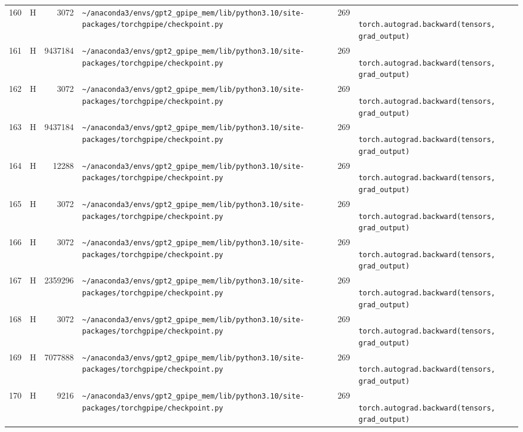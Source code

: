 \documentclass{article}
\begin{document}
\begin{longtable}{r l r p{6.5cm} r p{7.0cm}}
160 & H & 3072 & \lstinline|~/anaconda3/envs/gpt2_gpipe_mem/lib/python3.10/site-packages/torchgpipe/checkpoint.py| & 269 & \lstinline|            torch.autograd.backward(tensors, grad_output)| \\
161 & H & 9437184 & \lstinline|~/anaconda3/envs/gpt2_gpipe_mem/lib/python3.10/site-packages/torchgpipe/checkpoint.py| & 269 & \lstinline|            torch.autograd.backward(tensors, grad_output)| \\
162 & H & 3072 & \lstinline|~/anaconda3/envs/gpt2_gpipe_mem/lib/python3.10/site-packages/torchgpipe/checkpoint.py| & 269 & \lstinline|            torch.autograd.backward(tensors, grad_output)| \\
163 & H & 9437184 & \lstinline|~/anaconda3/envs/gpt2_gpipe_mem/lib/python3.10/site-packages/torchgpipe/checkpoint.py| & 269 & \lstinline|            torch.autograd.backward(tensors, grad_output)| \\
164 & H & 12288 & \lstinline|~/anaconda3/envs/gpt2_gpipe_mem/lib/python3.10/site-packages/torchgpipe/checkpoint.py| & 269 & \lstinline|            torch.autograd.backward(tensors, grad_output)| \\
165 & H & 3072 & \lstinline|~/anaconda3/envs/gpt2_gpipe_mem/lib/python3.10/site-packages/torchgpipe/checkpoint.py| & 269 & \lstinline|            torch.autograd.backward(tensors, grad_output)| \\
166 & H & 3072 & \lstinline|~/anaconda3/envs/gpt2_gpipe_mem/lib/python3.10/site-packages/torchgpipe/checkpoint.py| & 269 & \lstinline|            torch.autograd.backward(tensors, grad_output)| \\
167 & H & 2359296 & \lstinline|~/anaconda3/envs/gpt2_gpipe_mem/lib/python3.10/site-packages/torchgpipe/checkpoint.py| & 269 & \lstinline|            torch.autograd.backward(tensors, grad_output)| \\
168 & H & 3072 & \lstinline|~/anaconda3/envs/gpt2_gpipe_mem/lib/python3.10/site-packages/torchgpipe/checkpoint.py| & 269 & \lstinline|            torch.autograd.backward(tensors, grad_output)| \\
169 & H & 7077888 & \lstinline|~/anaconda3/envs/gpt2_gpipe_mem/lib/python3.10/site-packages/torchgpipe/checkpoint.py| & 269 & \lstinline|            torch.autograd.backward(tensors, grad_output)| \\
170 & H & 9216 & \lstinline|~/anaconda3/envs/gpt2_gpipe_mem/lib/python3.10/site-packages/torchgpipe/checkpoint.py| & 269 & \lstinline|            torch.autograd.backward(tensors, grad_output)| \\

\end{longtable}
\end{document}
